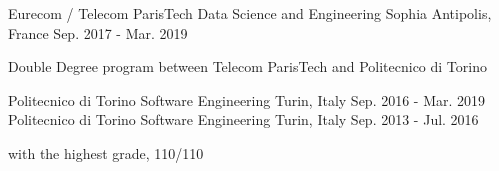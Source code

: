 \begin{cventries}
	\cventry
		{Eurecom / Telecom ParisTech}
		{ Data Science and Engineering}
		{Sophia Antipolis, France}
		{Sep. 2017 - Mar. 2019}
		{
		\begin{cvitems}
			\item {Double Degree program between Telecom ParisTech and Politecnico di Torino}
		\end{cvitems}			
		}
	\cventry
		{Politecnico di Torino}
		{ Software Engineering}
		{Turin, Italy}
		{Sep. 2016 - Mar. 2019}
		{}
	\cventry
		{Politecnico di Torino}
		{ Software Engineering}
		{Turin, Italy}
		{Sep. 2013 - Jul. 2016}
		{
		\begin{cvitems}
			\item {with the highest grade, 110/110}
		\end{cvitems}
		}
\end{cventries}
